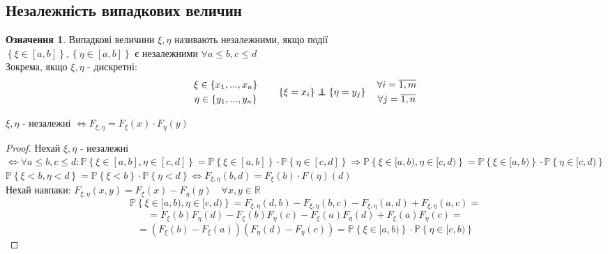 \documentclass[fontsize=14pt,a4paper]{scrartcl}
\theoremstyle{definition}
\newtheorem*{defo}{Означення}
\theoremstyle{remark}
\theoremstyle{definition}
\theoremstyle{definition}
\newcommand\independent{\protect\mathpalette{\protect\independenT}{\perp}}
\def\independenT#1#2{\mathrel{\rlap{$#1#2$}\mkern2mu{#1#2}}}
\begin{document}
\subsection{Незалежність випадкових величин}
\begin{defo}
	Випадкові величини $\xi, \eta$ називають незалежними, якщо події \\$ \left\lbrace \xi\in [a,b] \right\rbrace, \left\lbrace \eta\in [a,b] \right\rbrace $ є незалежними $ \forall a \leq  b , c\leq d$\\
	Зокрема, якщо $\xi, \eta$ - дискретні:
	$$
	\begin{gathered}
	 \xi \in \left\lbrace x_1, ..., x_n \right\rbrace\\
	 \eta \in \left\lbrace y_1, ..., y_n  \right\rbrace
	\end{gathered} \qquad \left\lbrace \xi = x_i \right\rbrace \independent \left\lbrace \eta = y_j \right\rbrace \quad \begin{gathered}
	 \forall i = \overline{1, m}\\
	 \forall j = \overline{1, n}
	\end{gathered}
	$$

\end{defo}
\begin{boxteo}
	$\xi, \eta$ - незалежні $\Leftrightarrow F_{\xi, \eta} = F_{\xi}(x) \cdot F_{\eta}(y)$
\end{boxteo}
\begin{proof}
Нехай $\xi, \eta$ - незалежні $\Leftrightarrow \forall a\leq b, c\leq d: \mathbb{P} \left\lbrace  \xi \in [a,b], \eta \in [c,d] \right\rbrace = \mathbb{P} \left\lbrace \xi\in[a,b] \right\rbrace \cdot \mathbb{P} \left\lbrace \eta\in[c,d] \right\rbrace \Rightarrow \mathbb{P} \left\lbrace  \xi\in [a,b), \eta \in [c,d) \right\rbrace = \mathbb{P} \left\lbrace \xi \in [a,b) \right\rbrace \cdot \mathbb{P} \left\lbrace \eta \in [c,d) \right\rbrace  $\\
$
\mathbb{P} \left\lbrace \xi<b, \eta <d  \right\rbrace = \mathbb{P} \left\lbrace \xi < b \right\rbrace \cdot \mathbb{P} \left\lbrace \eta <d \right\rbrace \Leftrightarrow F_{\xi, \eta} (b,d) = F_{\xi}(b) \cdot F(\eta)(d)
$\\
Нехай навпаки: $ F_{\xi, \eta } (x,y)  = F_{\xi}(x) - F_{\eta}(y)\quad \forall x,y \in \mathbb{R}$
$$
\mathbb{P} \left\lbrace  \xi\in [a,b), \eta \in [c,d)\right\rbrace = F_{\xi, \eta} (d,b) - F_{\xi,\eta}(b,c) - F_{\xi, \eta }(a,d) + F_{\xi, \eta}(a,c) =
$$
$$
= F_{\xi}(b) F_{\eta} (d) - F_{\xi}(b) F_{\eta}(c) - F_{\xi}(a) F_{\eta}(d) + F_{\xi}(a) F_{\eta}(c)  =$$
$$= \left( F_{\xi}(b) - F_{\xi}(a) \right) \left( F_{\eta}(d) - F_\eta (c) \right) = \mathbb{P} \left\lbrace \xi\in [a,b) \right\rbrace \cdot \mathbb{P} \left\lbrace \eta \in [c,b) \right\rbrace
$$

\end{proof}


\newpage

\vfill

\end{document}
